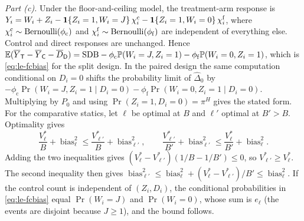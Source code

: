 \emph{Part (c).} Under the floor-and-ceiling model, the treatment-arm response is $Y_i=W_i+Z_i-\mathbf{1}\!\left\{Z_i=1,W_i=J\right\}\chi^{\mathrm c}_i-\mathbf{1}\!\left\{Z_i=1,W_i=0\right\}\chi^{\mathrm f}_i$, where $\chi^{\mathrm c}_i\sim\operatorname{Bernoulli}(\phi_{\mathrm c})$ and $\chi^{\mathrm f}_i\sim\operatorname{Bernoulli}(\phi_{\mathrm f})$ are independent of everything else. Control and direct responses are unchanged. Hence $\mathbb{E}(\overline Y_{\mathsf{T}}-\overline Y_{\mathsf{C}}-\overline D_{\mathsf{D}})=\mathrm{SDB}-\phi_{\mathrm c}\mathbb{P}(W_i=J,Z_i=1)-\phi_{\mathrm f}\mathbb{P}(W_i=0,Z_i=1)$, which is \eqref{eq:le-fcbias} for the split design. In the paired design the same computation conditional on $D_i=0$ shifts the probability limit of $\widehat\Delta_0$ by $-\phi_{\mathrm c}\Pr(W_i=J,Z_i=1\mid D_i=0)-\phi_{\mathrm f}\Pr(W_i=0,Z_i=1\mid D_i=0)$. Multiplying by $P_0$ and using $\Pr(Z_i=1,D_i=0)=\pi^H$ gives the stated form.
For the comparative statics, let $\ell$ be optimal at $B$ and $\ell'$ optimal at $B'>B$. Optimality gives
\[
  \frac{V^*_\ell}{B}+\operatorname{bias}_\ell^2\le\frac{V^*_{\ell'}}{B}+\operatorname{bias}_{\ell'}^2,\qquad
  \frac{V^*_{\ell'}}{B'}+\operatorname{bias}_{\ell'}^2\le\frac{V^*_{\ell}}{B'}+\operatorname{bias}_{\ell}^2.
\]
Adding the two inequalities gives $(V^*_\ell-V^*_{\ell'})(1/B-1/B')\le0$, so $V^*_{\ell'}\ge V^*_\ell$. The second inequality then gives $\operatorname{bias}_{\ell'}^2\le\operatorname{bias}_\ell^2+(V^*_\ell-V^*_{\ell'})/B'\le\operatorname{bias}_\ell^2$. If the control count is independent of $(Z_i,D_i)$, the conditional probabilities in \eqref{eq:le-fcbias} equal $\Pr(W_i=J)$ and $\Pr(W_i=0)$, whose sum is $e_\ell$ (the events are disjoint because $J\ge1$), and the bound follows.

